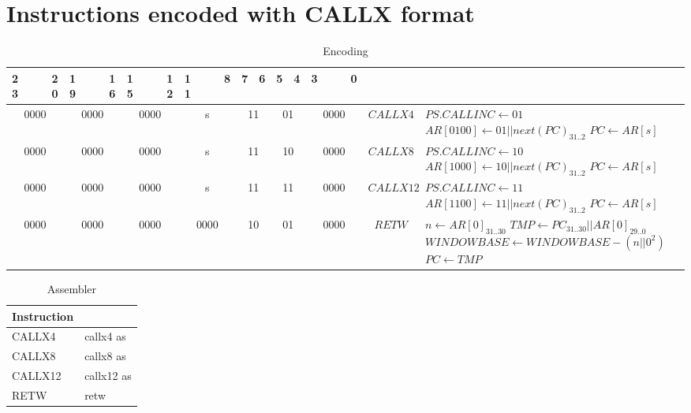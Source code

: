 \section*{Instructions encoded with CALLX format}
\begin{longtable}{llllllllllllllllllllllll  p{1cm}  p{6cm} | }
	\caption{Encoding\label{long}}\\
	23 & & & 20 & 19 & & & 16 & 15 & & & 12 & 11 & & & 8 & 7 & 6 & 5 & 4 & 3 & & & 0 & & \multicolumn{1}{c}{}\\
	\hline
	\multicolumn{4}{|c|}{0000} & \multicolumn{4}{c|}{0000} & \multicolumn{4}{c|}{0000} & \multicolumn{4}{c|}{s} & \multicolumn{2}{c|}{11} & \multicolumn{2}{c|}{01} & \multicolumn{4}{c|}{0000} & \multicolumn{1}{c|}{$CALLX4$} & $PS.CALLINC \leftarrow {01}$ \newline $AR[0100] \leftarrow 01||next(PC)_{31..2}$ \newline $PC \leftarrow AR[s]$\\ \hline
	\multicolumn{4}{|c|}{0000} & \multicolumn{4}{c|}{0000} & \multicolumn{4}{c|}{0000} & \multicolumn{4}{c|}{s} & \multicolumn{2}{c|}{11} & \multicolumn{2}{c|}{10} & \multicolumn{4}{c|}{0000} & \multicolumn{1}{c|}{$CALLX8$} & $PS.CALLINC \leftarrow {10}$ \newline $AR[1000] \leftarrow 10||next(PC)_{31..2}$ \newline $PC \leftarrow AR[s]$\\ \hline
	\multicolumn{4}{|c|}{0000} & \multicolumn{4}{c|}{0000} & \multicolumn{4}{c|}{0000} & \multicolumn{4}{c|}{s} & \multicolumn{2}{c|}{11} & \multicolumn{2}{c|}{11} & \multicolumn{4}{c|}{0000} & \multicolumn{1}{c|}{$CALLX12$} & $PS.CALLINC \leftarrow {11}$ \newline $AR[1100] \leftarrow 11||next(PC)_{31..2}$ \newline $PC \leftarrow AR[s]$\\ \hline
	\multicolumn{4}{|c|}{0000} & \multicolumn{4}{c|}{0000} & \multicolumn{4}{c|}{0000} & \multicolumn{4}{c|}{0000} & \multicolumn{2}{c|}{10} & \multicolumn{2}{c|}{01} & \multicolumn{4}{c|}{0000} & \multicolumn{1}{c|}{$RETW$} & $n \leftarrow AR[0]_{31..30}$ \newline $TMP \leftarrow PC_{31..30}||AR[0]_{29..0}$ \newline $WINDOWBASE \leftarrow WINDOWBASE - (n||0^2)$ \newline $PC \leftarrow TMP$\\ \hline
\end{longtable}

\begin{longtable}{|p{5cm}|p{5cm}|}
	\caption{Assembler\label{long}}\\
	\hline
	Instruction & \\
	\hline
	CALLX4 & callx4 as\\ \hline
	CALLX8 & callx8 as\\ \hline
	CALLX12 & callx12 as\\ \hline
	RETW & retw\\ \hline
\end{longtable}

